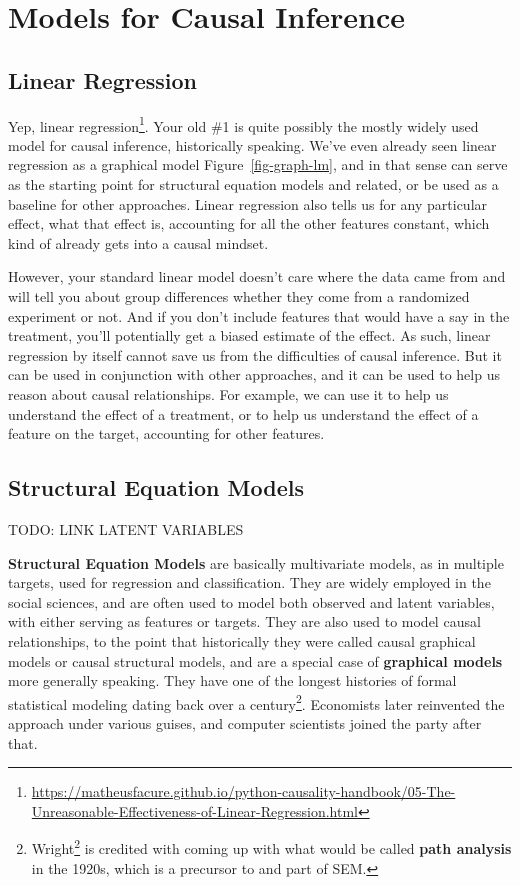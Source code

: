 \documentclass[
  letterpaper,
]{krantz}
\DeclareRobustCommand{\href}[2]{#2\footnote{\url{#1}}}
\begin{document}
\section{Models for Causal Inference}\label{models-for-causal-inference}

\subsection{Linear Regression}\label{linear-regression}

Yep,
\href{https://matheusfacure.github.io/python-causality-handbook/05-The-Unreasonable-Effectiveness-of-Linear-Regression.html}{linear
regression}. Your old \#1 is quite possibly the mostly widely used model
for causal inference, historically speaking. We've even already seen
linear regression as a graphical model Figure~\ref{fig-graph-lm}, and in
that sense can serve as the starting point for structural equation
models and related, or be used as a baseline for other approaches.
Linear regression also tells us for any particular effect, what that
effect is, accounting for all the other features constant, which kind of
already gets into a causal mindset.

However, your standard linear model doesn't care where the data came
from and will tell you about group differences whether they come from a
randomized experiment or not. And if you don't include features that
would have a say in the treatment, you'll potentially get a biased
estimate of the effect. As such, linear regression by itself cannot save
us from the difficulties of causal inference. But it can be used in
conjunction with other approaches, and it can be used to help us reason
about causal relationships. For example, we can use it to help us
understand the effect of a treatment, or to help us understand the
effect of a feature on the target, accounting for other features.

\subsection{Structural Equation
Models}\label{structural-equation-models}

TODO: LINK LATENT VARIABLES

\textbf{Structural Equation Models} are basically multivariate models,
as in multiple targets, used for regression and classification. They are
widely employed in the social sciences, and are often used to model both
observed and latent variables, with either serving as features or
targets. They are also used to model causal relationships, to the point
that historically they were called causal graphical models or causal
structural models, and are a special case of \textbf{graphical models}
more generally speaking. They have one of the longest histories of
formal statistical modeling dating back over a century\footnote{\href{https://en.wikipedia.org/wiki/Sewall_Wright}{Wright}
  is credited with coming up with what would be called \textbf{path
  analysis} in the 1920s, which is a precursor to and part of SEM.}.
Economists later reinvented the approach under various guises, and
computer scientists joined the party after that.
\end{document}
